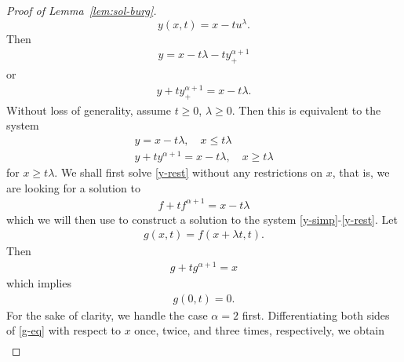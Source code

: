 \documentclass[12pt,reqno]{amsart}
\numberwithin{equation}{section}  %
\numberwithin{figure}{section}
\begin{document}
\begin{proof}[Proof of Lemma~\ref{lem:sol-burg}]
\begin{equation}
    \label{y-for-u}
    y(x,t) = x - tu^{\lambda}. 
\end{equation}
%
%
%
%
Then
%
%
\begin{equation*}
\begin{split}
y = x - t \lambda - t y_{+}^{\alpha + 1}
\end{split}
\end{equation*}
%
%
or
%
\begin{equation*}
\begin{split}
y + ty_{+}^{\alpha + 1} = x - t \lambda.
\end{split}
\end{equation*}
%
%
Without loss of generality, assume $t \ge 0$, $\lambda \ge 0$. 
Then this is equivalent to the system
%
%
\begin{gather}
    \label{y-simp}
    y= x - t \lambda, \quad x \le t \lambda
    \\
    \label{y-rest}
    y + ty^{\alpha + 1} = x - t \lambda, \quad x \ge t \lambda
\end{gather}
for $x \ge t \lambda$. We shall first solve \eqref{y-rest} without any
restrictions on $x$, that is, we are looking for a
solution to 
%
%
\begin{equation}
    \label{f-eq}
\begin{split}
f + tf^{\alpha + 1} = x - t \lambda
\end{split}
\end{equation}
%
%
which we will then use to 
construct a solution to the system
\eqref{y-simp}-\eqref{y-rest}. Let
%
%
\begin{equation*}
\begin{split}
    g(x,t) = f(x + \lambda t, t).
\end{split}
\end{equation*}
%
%
Then
%
%
\begin{equation}
    \label{g-eq}
\begin{split}
g + t g^{\alpha + 1} = x
\end{split}
\end{equation}
%
%
which implies
%
%
\begin{equation*}
\begin{split}
g(0, t) = 0.
\end{split}
\end{equation*}
%
%
For the sake of clarity, we handle the case $\alpha =2$ first.
Differentiating both sides of \eqref{g-eq} with respect to $x$ once, twice, and
three times, respectively, we obtain
%
%
\begin{gather*}

\end{gather*}
\end{proof}
\end{document}
